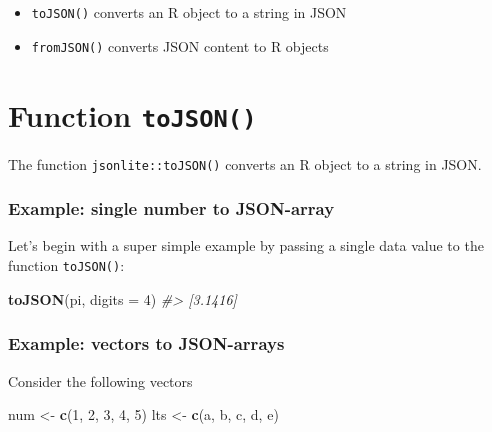 \documentclass[
]{book}
\newenvironment{Shaded}{\begin{snugshade}}{\end{snugshade}}
\newcommand{\AttributeTok}[1]{\textcolor[rgb]{0.13,0.29,0.53}{#1}}
\newcommand{\CommentTok}[1]{\textcolor[rgb]{0.56,0.35,0.01}{\textit{#1}}}
\newcommand{\DecValTok}[1]{\textcolor[rgb]{0.00,0.00,0.81}{#1}}
\newcommand{\FunctionTok}[1]{\textcolor[rgb]{0.13,0.29,0.53}{\textbf{#1}}}
\newcommand{\NormalTok}[1]{#1}
\newcommand{\OtherTok}[1]{\textcolor[rgb]{0.56,0.35,0.01}{#1}}
\newcommand{\StringTok}[1]{\textcolor[rgb]{0.31,0.60,0.02}{#1}}
\begin{document}
\begin{itemize}
\item
  \texttt{toJSON()} converts an R object to a string in JSON
\item
  \texttt{fromJSON()} converts JSON content to R objects
\end{itemize}

\hypertarget{function-tojson}{%
\section{\texorpdfstring{Function \texttt{toJSON()}}{Function toJSON()}}\label{function-tojson}}

The function \texttt{jsonlite::toJSON()} converts an R object to a string in JSON.

\hypertarget{example-single-number-to-json-array}{%
\subsubsection*{Example: single number to JSON-array}\label{example-single-number-to-json-array}}

Let's begin with a super simple example by passing a single data value to the
function \texttt{toJSON()}:

\begin{Shaded}
\begin{Highlighting}[]
\FunctionTok{toJSON}\NormalTok{(pi, }\AttributeTok{digits =} \DecValTok{4}\NormalTok{)}
\CommentTok{\#\textgreater{} [3.1416]}
\end{Highlighting}
\end{Shaded}

\hypertarget{example-vectors-to-json-arrays}{%
\subsubsection*{Example: vectors to JSON-arrays}\label{example-vectors-to-json-arrays}}

Consider the following vectors

\begin{Shaded}
\begin{Highlighting}[]
\NormalTok{num }\OtherTok{\textless{}{-}} \FunctionTok{c}\NormalTok{(}\DecValTok{1}\NormalTok{, }\DecValTok{2}\NormalTok{, }\DecValTok{3}\NormalTok{, }\DecValTok{4}\NormalTok{, }\DecValTok{5}\NormalTok{)}
\NormalTok{lts }\OtherTok{\textless{}{-}} \FunctionTok{c}\NormalTok{(}\StringTok{\textquotesingle{}a\textquotesingle{}}\NormalTok{, }\StringTok{\textquotesingle{}b\textquotesingle{}}\NormalTok{, }\StringTok{\textquotesingle{}c\textquotesingle{}}\NormalTok{, }\StringTok{\textquotesingle{}d\textquotesingle{}}\NormalTok{, }\StringTok{\textquotesingle{}e\textquotesingle{}}\NormalTok{)}
\end{Highlighting}
\end{Shaded}
\end{document}
